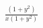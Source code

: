 \documentclass[preview]{standalone}
\begin{document}
\begin{align*}
\frac{\left( 1 + {y}^{2} \right)}{x ( 1 + y^2 )}
\end{align*}
\end{document}

